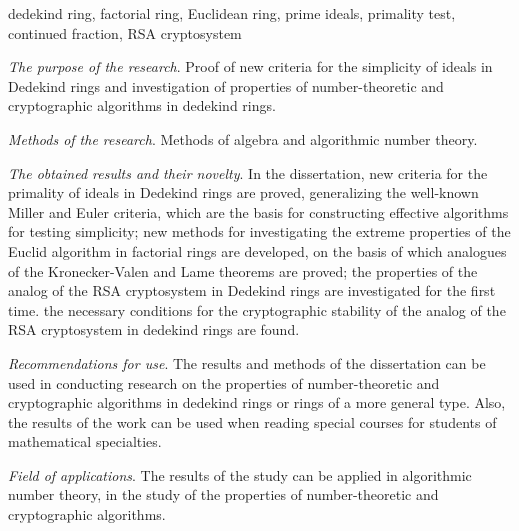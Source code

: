 \documentclass[_00_autoref.tex]{subfiles}
\begin{document}
\noindent
dedekind ring, factorial ring, Euclidean ring, prime ideals, primality test, continued fraction, RSA cryptosystem

\textit{The purpose of the research}.
Proof of new criteria for the simplicity of ideals in Dedekind rings and investigation of properties of number-theoretic and cryptographic algorithms in dedekind rings.

\textit{Methods of the research}.
Methods of algebra and algorithmic number theory.

\textit{The obtained results and their novelty}.
In the dissertation, new criteria for the primality of ideals in Dedekind rings are proved, generalizing the well-known Miller and Euler criteria, which are the basis for constructing effective algorithms for testing simplicity; new methods for investigating the extreme properties of the Euclid algorithm in factorial rings are developed, on the basis of which analogues of the Kronecker-Valen and Lame theorems are proved; the properties of the analog of the RSA cryptosystem in Dedekind rings are investigated for the first time. the necessary conditions for the cryptographic stability of the analog of the RSA cryptosystem in dedekind rings are found.

\textit{Recommendations for use}.
The results and methods of the dissertation can be used in conducting research on the properties of number-theoretic and cryptographic algorithms in dedekind rings or rings of a more general type.
Also, the results of the work can be used when reading special courses for students of mathematical specialties.

\textit{Field of applications}.
The results of the study can be applied in algorithmic number theory, in the study of the properties of number-theoretic and cryptographic algorithms.
\end{document}
